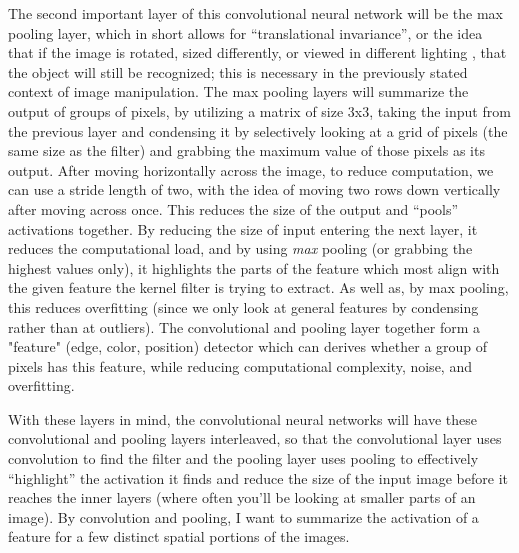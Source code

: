 \documentclass[10pt,twocolumn]{article}
\begin{document}

The second important layer of this convolutional neural network will be the max pooling layer, which in short allows for “translational invariance”, or the idea that if the image is rotated, sized differently, or viewed in different lighting \cite{Khandelwal2018}, that the object will still be recognized; this is necessary in the previously stated context of image manipulation. The max pooling layers will summarize the output of groups of pixels, by utilizing a matrix of size 3x3, taking the input from the previous layer and condensing it by selectively looking at a grid of pixels (the same size as the filter) and grabbing the maximum value of those pixels as its output. After moving horizontally across the image, to reduce computation, we can use a stride length of two, with the idea of moving two rows down vertically after moving across once. This reduces the size of the output and “pools” activations together. By reducing the size of input entering the next layer, it reduces the computational load, and by using \textit{max} pooling (or grabbing the highest values only), it highlights the parts of the feature which most align with the given feature the kernel filter is trying to extract. As well as, by max pooling, this reduces overfitting (since we only look at general features by condensing rather than at outliers). The convolutional and pooling layer together form a "feature" (edge, color, position) detector which can derives whether a group of pixels has this feature, while reducing computational complexity, noise, and overfitting. 

With these layers in mind, the convolutional neural networks will have these convolutional and pooling layers interleaved, so that the convolutional layer uses convolution to find the filter and the pooling layer uses pooling to effectively “highlight” the activation it finds and reduce the size of the input image before it reaches the inner layers (where often you’ll be looking at smaller parts of an image). By convolution and pooling, I want to summarize the activation of a feature for a few distinct spatial portions of the images.
\end{document}
